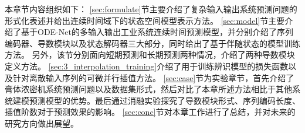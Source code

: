 本章节内容组织如下：
\ref{sec:formulate}节主要介绍了复杂输入输出系统预测问题的形式化表述并给出连续时间域下的状态空间模型表示方法。
\ref{sec:model}节主要介绍了基于ODE-Net的多输入输出工业系统连续时间预测模型，并分别介绍了序列编码器、导数模块以及状态解码器三大部分，同时给出了基于伴随状态的模型训练方法。
另外，该节分别面向短期预测和长期预测两种情况，介绍了两种导数模块定义方法。
\ref{sec:3_interpolation_training}介绍了用于训练辨识模型的损失函数以及针对离散输入序列的可微并行插值方法。
\ref{sec:case}节为实验章节，首先介绍了膏体浓密机系统预测问题以及数据集形式，然后对比了本章所述方法相比于其他系统建模预测模型的优势。最后通过消融实验探究了导数模块形式、序列编码长度、插值阶数对于预测效果的影响。
\ref{sec:conc}节对本章工作进行了总结，并对未来的研究方向做出展望。

